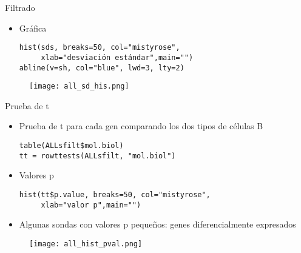 \documentclass{beamer}
\begin{document}
\begin{frame}[fragile]{Filtrado}
\begin{itemize}
\item Gráfica
\begin{verbatim}
hist(sds, breaks=50, col="mistyrose",
     xlab="desviación estándar",main="")
abline(v=sh, col="blue", lwd=3, lty=2)
\end{verbatim}
\end{itemize}
\begin{figure}
\centering
\texttt{[image: all\_sd\_his.png]}
\end{figure}
\end{frame}


\begin{frame}[fragile]{Prueba de t}
\begin{itemize}
\item Prueba de t para cada gen comparando los dos tipos de células B
\begin{verbatim}
table(ALLsfilt$mol.biol)
tt = rowttests(ALLsfilt, "mol.biol")
\end{verbatim}
\item Valores p
\begin{verbatim}
hist(tt$p.value, breaks=50, col="mistyrose",
     xlab="valor p",main="")
\end{verbatim}
\item Algunas sondas con valores p pequeños: genes diferencialmente expresados
\end{itemize}
\begin{figure}
\centering
\texttt{[image: all\_hist\_pval.png]}
\end{figure}
\end{frame}
\end{document}
